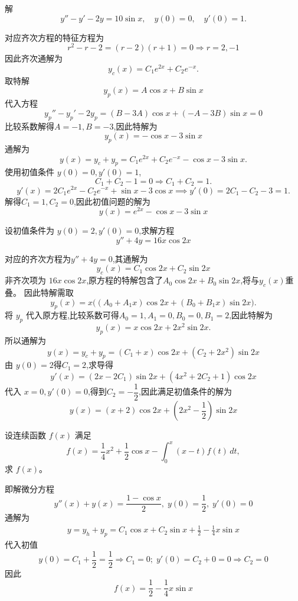\begin{questions}
    \question 解
    \[
    y'' - y' - 2y = 10 \sin x, \quad y(0)=0, \quad y'(0)=1.
    \]
    \begin{solution}
        对应齐次方程的特征方程为
        \[
        r^2 - r - 2 =(r-2)(r+1)=0 \Rightarrow r=2,-1
        \]
        因此齐次通解为
        \[
        y_c(x) = C_1 e^{2x} + C_2 e^{-x}.
        \]
        取特解
        \[
        y_p(x) = A \cos x + B \sin x
        \]
        代入方程
        \[
        y_p'' - y_p' - 2y_p = (B - 3A)\cos x + (-A - 3B)\sin x=0
        \]
        比较系数解得$A=-1, B=-3$,因此特解为
        \[
        y_p(x) = -\cos x - 3 \sin x
        \]
        通解为
        \[
        y(x) = y_c + y_p = C_1 e^{2x} + C_2 e^{-x} - \cos x - 3 \sin x.
        \]
        使用初值条件 $y(0)=0,y'(0)=1$,
        \[
        C_1 + C_2 - 1 = 0 \Rightarrow C_1 + C_2 = 1.
        \]
        \[
        y'(x) = 2C_1 e^{2x} - C_2 e^{-x} + \sin x - 3 \cos x \implies y'(0) = 2C_1 - C_2 - 3 = 1.
        \]
        解得$C_1 = 1, C_2 = 0$,因此初值问题的解为
        \[
        y(x) = e^{2x} - \cos x - 3 \sin x
        \]
    \end{solution}

    \question 设初值条件为 $y(0)=2, y'(0)=0$,求解方程
    \[
    y''+4y=16x\cos 2x
    \]
    \begin{solution}
        对应的齐次方程为$y''+4y=0$,其通解为
        \[
        y_c(x)=C_1 \cos 2x + C_2 \sin 2x
        \]
        非齐次项为 $16x\cos 2x$,原方程的特解包含了$A_0 \cos 2x + B_0 \sin 2x$,将与$y_c(x)$重叠。
        因此特解需取
        \[
        y_p(x)=x\bigl((A_0+A_1x)\cos 2x+(B_0+B_1x)\sin 2x\bigr).
        \]
        将 $y_p$ 代入原方程,比较系数可得$A_0=1,A_1=0,B_0=0,B_1=2$,因此特解为
        \[
        y_p(x)=x\cos 2x+2x^2\sin 2x.
        \]
        所以通解为
        \[
        y(x)=y_c+y_p=(C_1+x)\cos 2x+(C_2+2x^2)\sin 2x
        \]
        由 $y(0)=2$得$C_1=2$,求导得
        \[
        y'(x)=(2x - 2C_1) \sin2x + (4x^2 + 2C_2 + 1) \cos2x
        \]
        代入 $x=0,y'(0)=0$,得到$C_2=-\dfrac12$,因此满足初值条件的解为
        \[
        y(x)=(x+2)\cos 2x+\left(2x^2-\frac12\right)\sin 2x
        \]
    \end{solution}

    \question 设连续函数 $f(x)$ 满足
    \[
    f(x)=\frac14 x^{2}+\frac12\cos x-\int_{0}^{x}(x-t)f(t)\,dt,
    \]
    求 $f(x)$。  
    \begin{solution}
        即解微分方程
        \[
        y''(x) + y(x) = \frac{1 - \cos x}{2},\;y(0) = \frac{1}{2}, \; y'(0) = 0
        \]
        通解为
        \begin{align*}
        y = y_h + y_p = C_1\cos x + C_2\sin x + \frac{1}{2} - \frac{1}{4}x\sin x
        \end{align*}
        代入初值
        \[
        y(0) = C_1 + \frac{1}{2} = \frac{1}{2} \Rightarrow C_1 = 0 ;\;
        y'(0) = C_2 + 0 = 0 \Rightarrow C_2 = 0
        \]
        因此
        \[
        f(x) = \frac{1}{2} - \frac{1}{4}x\sin x
        \]
    \end{solution}


\end{questions}
